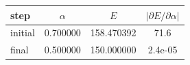 \begin{center}
\label{tab:1d-optimization}
\setlength{\tabcolsep}{4pt}
\begin{tabular}{@{}lccc@{}}
\toprule
step & $\alpha$ & $E$ & $|\partial E/\partial\alpha|$ \\
\midrule
initial & 0.700000 & 158.470392 & 71.6 \\
final & 0.500000 & 150.000000 & 2.4e-05 \\
\bottomrule
\end{tabular}
\end{center}
